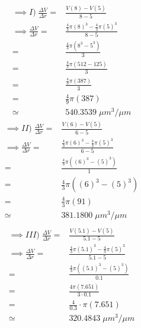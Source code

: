 \begin{multicols*}{3}
	\noindent
	\begin{align*}
		\implies I)\; \frac{\Delta V}{\Delta r} = & \frac{V(8)-V(5)}{8-5}                               \\
		\implies\frac{\Delta V}{\Delta r} =       & \frac{\frac{4}{3}\pi(8)^3-\frac{4}{3}\pi(5)^3}{8-5} \\
        =       & \frac{\frac{4}{3}\pi(8^3-5^3)}{3}\\
        =       &\frac{\frac{4}{3}\pi(512-125)}{3}\\
        =       &\frac{\frac{4}{3}\pi(387)}{3}\\
        =       &\frac{4}{9}\pi(387)\\
		\simeq                                    & 540.3539 \; \mu m^3/\mu m
	\end{align*}
	\columnbreak
	\begin{align*}
		\implies II)\; \frac{\Delta V}{\Delta r} = & \frac{V(6)-V(5)}{6-5}                               \\
		\implies\frac{\Delta V}{\Delta r} =        & \frac{\frac{4}{3}\pi(6)^3-\frac{4}{3}\pi(5)^3}{6-5} \\
		=                                          & \frac{\frac{4}{3}\pi((6)^3-(5)^3)}{1}               \\
		=                                          & \frac{4}{3}\pi((6)^3-(5)^3)                         \\
		=                                          & \frac{4}{3}\pi(91)                                  \\
		\simeq                                     & 381.1800\; \mu m^3/\mu m                                    \\
	\end{align*}
	\columnbreak
	\begin{align*}
		\implies III)\; \frac{\Delta V}{\Delta r} = & \frac{V(5.1)-V(5)}{5.1-5}                               \\
		\implies \frac{\Delta V}{\Delta r} =        & \frac{\frac{4}{3}\pi(5.1)^3-\frac{4}{3}\pi(5)^3}{5.1-5} \\
		=                                           & \frac{\frac{4}{3}\pi((5.1)^3-(5)^3)}{0.1}               \\
		=                                           & \frac{4\pi(7.651)}{3\cdot 0.1}                          \\
		=                                           & \frac{4}{0.3}\cdot \pi(7.651)                           \\
		\simeq                                      & 320.4843\;\mu m^3/\mu m
	\end{align*}
\end{multicols*}
